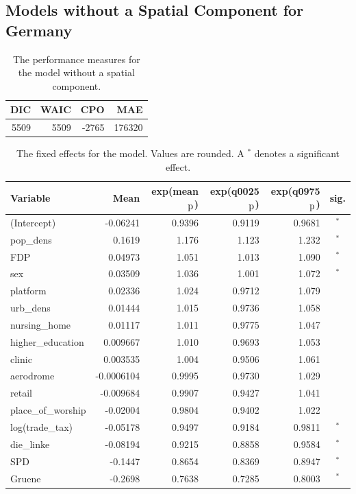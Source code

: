 \subsection{Models without a Spatial Component for Germany}
\begin{table}[H] 
\caption{The performance measures for the model without a spatial component. \label{allGermany_nospatial}}
\begin{tabular}{r r r r}
\toprule
\textbf{DIC}	& \textbf{WAIC} & \textbf{CPO} & \textbf{MAE}\\
\midrule
5509 & 5509 & -2765 &  176320 \\
\bottomrule
\end{tabular}
\end{table}
\begin{table}[H]
\caption{The fixed effects for the model. Values are rounded. A $^*$ denotes a significant effect. \label{FixedAllGermany_nospatial}}
\begin{tabular}{l r r r r c}
\toprule
\textbf{Variable}	& \textbf{Mean}	& \textbf{exp(mean$_{\hbox{p}}$)} & \textbf{exp(q0025$_{\hbox{p}}$)} & \textbf{exp(q0975$_{\hbox{p}}$)} & \textbf{sig.}\\
\midrule
(Intercept) & -0.06241 & 0.9396 & 0.9119 & 0.9681 & $^*$\\
pop\_dens & 0.1619 & 1.176 & 1.123 & 1.232 & $^*$\\
FDP & 0.04973 & 1.051 & 1.013 & 1.090 & $^*$\\
sex & 0.03509 & 1.036 & 1.001 & 1.072 & $^*$\\
platform & 0.02336 & 1.024 & 0.9712 & 1.079 \\
urb\_dens & 0.01444 & 1.015 & 0.9736 & 1.058 \\
nursing\_home & 0.01117 & 1.011 & 0.9775 & 1.047 \\
higher\_education & 0.009667 & 1.010 & 0.9693 & 1.053 \\
clinic & 0.003535 & 1.004 & 0.9506 & 1.061 \\
aerodrome & -0.0006104 & 0.9995 & 0.9730 & 1.029 \\
retail & -0.009684 & 0.9907 & 0.9427 & 1.041 \\
place\_of\_worship & -0.02004 & 0.9804 & 0.9402 & 1.022 \\
log(trade\_tax) & -0.05178 & 0.9497 & 0.9184 & 0.9811 & $^*$\\
die\_linke & -0.08194 & 0.9215 & 0.8858 & 0.9584 & $^*$\\
SPD & -0.1447 & 0.8654 & 0.8369 & 0.8947 & $^*$\\
Gruene & -0.2698 & 0.7638 & 0.7285 & 0.8003 & $^*$\\
\bottomrule
\end{tabular}
\end{table}
